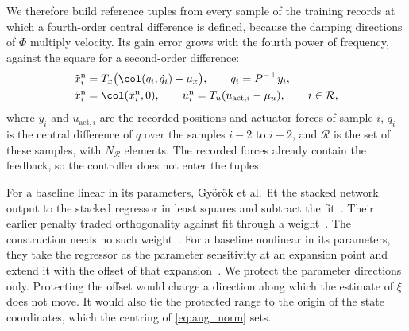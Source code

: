 We therefore build reference tuples from every sample of the training records
at which a fourth-order central difference is defined, because the damping
directions of $\Phi$ multiply velocity.
Its gain error grows with the fourth power of frequency, against the square
for a second-order difference:
\begin{equation}
\begin{aligned}
 \tilde x^{\mathrm n}_i&=T_x\bigl(\col(q_i,\dot q_i)-\mu_x\bigr),
 \qquad q_i=P^{-\top}y_i,\\
 \hat x^{\mathrm n}_i&=\col(\tilde x^{\mathrm n}_i,0),
 \qquad u^{\mathrm n}_i=T_u(u_{\mathrm{act},i}-\mu_u),
 \qquad i\in\mathcal R,
\end{aligned}
\label{eq:obc_tuples}
\end{equation}
where $y_i$ and $u_{\mathrm{act},i}$ are the recorded positions and actuator
forces of sample $i$, $\dot q_i$ is the central difference of $q$ over the
samples $i-2$ to $i+2$, and $\mathcal R$ is the set of these samples, with
$N_{\mathcal R}$ elements.
The recorded forces already contain the feedback, so the controller does not
enter the tuples.

For a baseline linear in its parameters, Gy\"or\"ok et al.\ fit the stacked
network output to the stacked regressor in least squares and subtract the
fit~\cite[Eqs.~(8), (10)]{gyorok2026obc}.
Their earlier penalty traded orthogonality against fit through a
weight~\cite[Eq.~(13), Remark~1]{gyorok2025l4dc}.
The construction needs no such weight~\cite[Sec.~3.2]{gyorok2026obc}.
For a baseline nonlinear in its parameters, they take the regressor as the
parameter sensitivity at an expansion point and extend it with the offset of
that expansion~\cite[Sec.~4, Eqs.~(15) to (18)]{gyorok2025l4dc}.
We protect the parameter directions only.
Protecting the offset would charge a direction along which the estimate of
$\xi$ does not move.
It would also tie the protected range to the origin of the state
coordinates, which the centring of \eqref{eq:aug_norm} sets.

